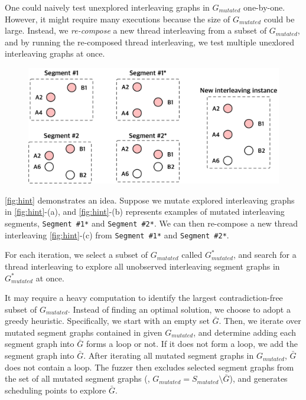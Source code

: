 





%
One could naively test unexplored interleaving graphs in $G_{mutated}$
one-by-one.
%
However, it might require many executions because the size of
$G_{mutated}$ could be large.
%
Instead, we \textit{re-compose} a new thread interleaving from a
subset of $G_{mutated}$, and by running the re-composed thread
interleaving, we test multiple unexlored interleaving graphs at once.


\begin{figure}[t]
  \centering
  \includegraphics[width=0.8\linewidth]{fig/hint.pdf}
  \caption{}
  \label{fig:hint}
\end{figure}


\autoref{fig:hint} demonstrates an idea. Suppose we mutate explored
interleaving graphs in \autoref{fig:hint}-(a), and
\autoref{fig:hint}-(b) represents examples of mutated interleaving
segments, \texttt{Segment \#1*} and \texttt{Segment \#2*}.
%
We can then re-compose a new thread interleaving
\autoref{fig:hint}-(c) from \texttt{Segment \#1*} and \texttt{Segment
  \#2*}.


%
For each iteration, we select a subset of $G_{mutated}$ called
$G^{*}_{mutated}$, and search for a thread interleaving to explore all
unobserved interleaving segment graphs in $G^{*}_{mutated}$ at once.



It may require a heavy computation to identify the largest
contradiction-free subset of $G_{mutated}$.
%
Instead of finding an optimal solution, we choose to adopt a greedy
heuristic.
%
Specifically, we start with an empty set $\bar{G}$. Then, we iterate
over mutated segment graphs contained in given $G_{mutated}$, and
determine adding each segment graph into $\bar{G}$ forms a loop or
not. If it does not form a loop, we add the segment graph into
$\bar{G}$.
%
After iterating all mutated segment graphs in $G_{mutated}$, $\bar{G}$
does not contain a loop. The fuzzer then excludes selected segment
graphs from the set of all mutated segment graphs (\ie,
$G_{mutated} = S_{mutated} \setminus \bar{G}$), and generates
scheduling points to explore $\bar{G}$.









